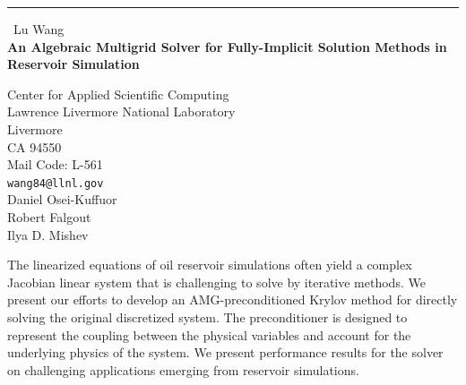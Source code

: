 \documentclass{report}
\begin{document}
\begin{center}
\rule{6in}{1pt} \
{\large Lu Wang \\
{\bf An Algebraic Multigrid Solver for Fully-Implicit Solution Methods in Reservoir Simulation}}

Center for Applied Scientific Computing \\ Lawrence Livermore National Laboratory \\ Livermore \\ CA 94550 \\ Mail Code: L-561
\\
{\tt wang84@llnl.gov}\\
Daniel Osei-Kuffuor\\
Robert Falgout\\
Ilya D. Mishev\end{center}

The linearized equations of oil reservoir simulations often
yield a complex Jacobian linear system that is challenging
to solve by iterative methods. We present our efforts to develop an
AMG-preconditioned Krylov method for directly
solving the original discretized system. The preconditioner
is designed to represent the coupling between the physical variables and
account for the underlying physics of the
system. We present performance results for the solver on
challenging applications emerging from reservoir simulations.
\end{document}
